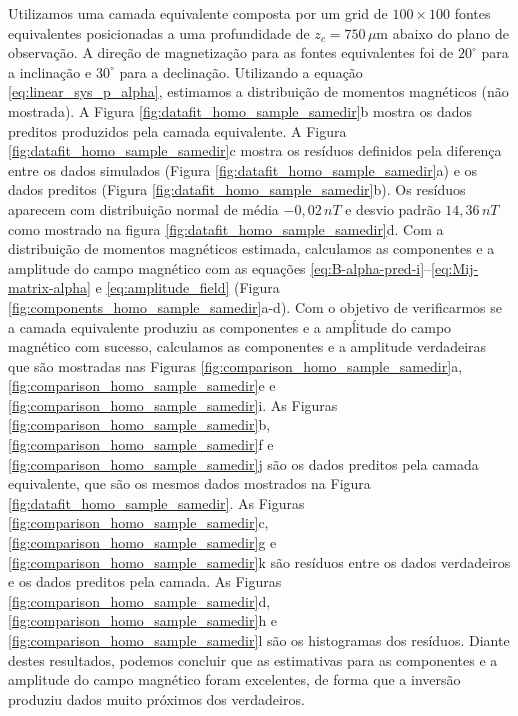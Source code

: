 Utilizamos uma camada equivalente composta por um grid de $100 \times 100$ fontes equivalentes posicionadas a uma profundidade de $z_c = 750\, \mu $m abaixo do plano de observação. A direção de magnetização para as fontes equivalentes foi de $20^\circ$ para a inclinação e $30^\circ$ para a declinação. Utilizando a equação \ref{eq:linear_sys_p_alpha}, estimamos a distribuição de momentos magnéticos (não mostrada). A Figura \ref{fig:datafit_homo_sample_samedir}b mostra os dados preditos produzidos pela camada equivalente. A Figura \ref{fig:datafit_homo_sample_samedir}c mostra os resíduos definidos pela diferença entre os dados simulados (Figura \ref{fig:datafit_homo_sample_samedir}a) e os dados preditos (Figura \ref{fig:datafit_homo_sample_samedir}b). Os resíduos aparecem com distribuição normal de média $-0,02 \, nT$ e desvio padrão $14,36 \, nT$ como mostrado na figura \ref{fig:datafit_homo_sample_samedir}d. Com a distribuição de momentos magnéticos estimada, calculamos as componentes e a amplitude do campo magnético com as equações \ref{eq:B-alpha-pred-i}--\ref{eq:Mij-matrix-alpha} e \ref{eq:amplitude_field} (Figura \ref{fig:components_homo_sample_samedir}a-d). Com o objetivo de verificarmos se a camada equivalente produziu as componentes e a ampĺitude do campo magnético com sucesso, calculamos as componentes e a amplitude verdadeiras que são mostradas nas Figuras \ref{fig:comparison_homo_sample_samedir}a, \ref{fig:comparison_homo_sample_samedir}e e \ref{fig:comparison_homo_sample_samedir}i. As Figuras \ref{fig:comparison_homo_sample_samedir}b, \ref{fig:comparison_homo_sample_samedir}f e \ref{fig:comparison_homo_sample_samedir}j são os dados preditos pela camada equivalente, que são os mesmos dados mostrados na Figura \ref{fig:datafit_homo_sample_samedir}.
As Figuras \ref{fig:comparison_homo_sample_samedir}c, \ref{fig:comparison_homo_sample_samedir}g e \ref{fig:comparison_homo_sample_samedir}k são resíduos entre os dados verdadeiros e os dados preditos pela camada. As Figuras \ref{fig:comparison_homo_sample_samedir}d, \ref{fig:comparison_homo_sample_samedir}h e \ref{fig:comparison_homo_sample_samedir}l são os histogramas dos resíduos. Diante destes resultados, podemos concluir que as estimativas para as componentes e a amplitude do campo magnético foram excelentes, de forma que a inversão produziu dados muito próximos dos verdadeiros.  

